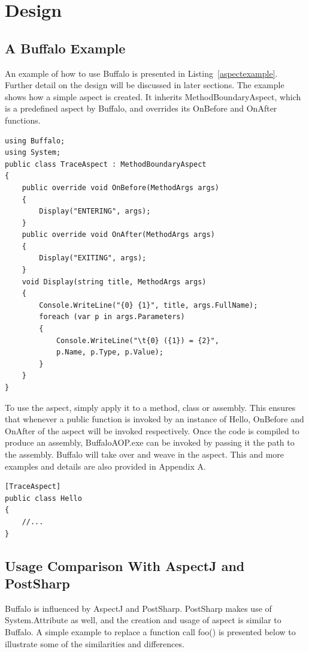 \chapter{Design}

\section{A Buffalo Example}

An example of how to use Buffalo is presented in Listing~\ref{aspectexample}. Further detail on the design will be discussed in later sections. The example shows how a simple aspect is created. It inherits MethodBoundaryAspect, which is a predefined aspect by Buffalo, and overrides its OnBefore and OnAfter functions.

\begin{lstlisting}[caption={Sample TraceAspect}, label=aspectexample]
using Buffalo;
using System;
public class TraceAspect : MethodBoundaryAspect
{
    public override void OnBefore(MethodArgs args)
    {
        Display("ENTERING", args);
    }
    public override void OnAfter(MethodArgs args)
    {
        Display("EXITING", args);
    }
    void Display(string title, MethodArgs args)
    {
        Console.WriteLine("{0} {1}", title, args.FullName);
        foreach (var p in args.Parameters)
        {
            Console.WriteLine("\t{0} ({1}) = {2}", 
			p.Name, p.Type, p.Value);
        }
    }
}
\end{lstlisting}

To use the aspect, simply apply it to a method, class or assembly. This ensures that whenever a public function is invoked by an instance of Hello, OnBefore and OnAfter of the aspect will be invoked respectively. Once the code is compiled to produce an assembly, BuffaloAOP.exe can be invoked by passing it the path to the assembly. Buffalo will take over and weave in the aspect. This and more examples and details are also provided in Appendix A.

\begin{lstlisting}[caption={Apply Aspect on Class Level}, label=helloaspect]
[TraceAspect]
public class Hello
{
    //...
}
\end{lstlisting}

\section{Usage Comparison With AspectJ and PostSharp}

Buffalo is influenced by AspectJ and PostSharp. PostSharp makes use of System.Attribute as well, and the creation and usage of aspect is similar to Buffalo. A simple example to replace a function call foo() is presented below to illustrate some of the similarities and differences.


